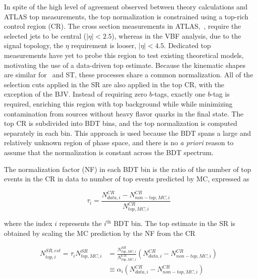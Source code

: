 In spite of the high level of agreement observed between theory
calculations and ATLAS top measurements, the top normalization is
constrained using a top-rich control region (CR). The cross section
measurements in
ATLAS,~\cite{bib:ttbar_cross_section,bib:Wt_cross_section}, require
the selected jets to be central ($|\eta|<2.5$), whereas in the VBF
analysis, due to the signal topology, the $\eta$ requirement is looser,
$|\eta|<4.5$. Dedicated top measurements have yet to probe this region
to test existing theoretical models, motivating the use of a
data-driven top estimate. Because the kinematic
shapes are similar for \ttbar~and ST, these processes share a common
normalization. All of the selection cuts applied in the SR are also
applied in the top CR, with the exception of the BJV. Instead of
requiring zero $b$-tags, exactly one $b$-tag is required, enriching
this region with top background while while minimizing contamination from
sources without heavy flavor quarks in the final state. The top CR is
subdivided into BDT bins, and the top
normalization is computed separately in each bin. This approach is
used because the BDT spans a large and relatively unknown region of
phase space, and there is no \textit{a priori} reason to assume that the
normalization is constant across the BDT spectrum. 

The normalization factor (NF) in each BDT bin is the ratio of the number of
top events in the CR in data to number of top events
predicted by MC, expressed as

\begin{equation}
\label{chap:analysis:equation:top_nf}
\tau_i = \frac{N_{data,i}^{CR} - N_{non-top,MC,i}^{CR}}{N_{top,MC,i}^{CR}}
\end{equation}

\noindent where the index $i$ represents the $i^{\textrm{th}}$ BDT bin. The top estimate in the SR is obtained by scaling the MC
prediction by the NF from the CR

\begin{equation}
\begin{aligned}
\label{chap:analysis:equation:top_est}
N_{top,i}^{SR,est} = \tau_i N_{top,MC,i}^{SR}
& = \frac{N_{top,MC,i}^{SR}}{N_{top,MC,i}^{CR}}(N_{data,i}^{CR} -
N_{non-top,MC,i}^{CR}) \\
& \equiv \alpha_i (N_{data,i}^{CR} - N_{non-top,MC,i}^{CR})
\end{aligned}
\end{equation}

